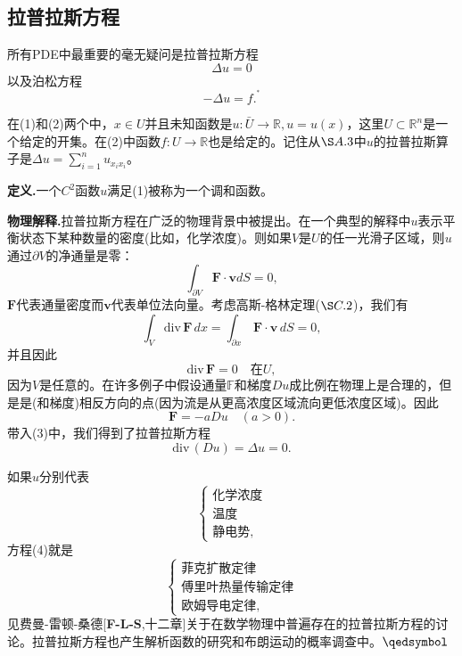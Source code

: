 \documentclass[leqno]{article}
\numberwithin{equation}{subsection}%
\begin{document}
\subsection{拉普拉斯方程}
所有PDE中最重要的毫无疑问是拉普拉斯方程
\begin{equation}
\Delta u=0
\end{equation}
以及泊松方程
\begin{equation}
-\Delta u=f.^{{}^{*}}
\end{equation}
\par
在(1)和(2)两个中，$x\in U$并且未知函数是$u:\bar{U}\rightarrow\mathbb{R},u=u(x)$，这里$U\subset\mathbb{R}^{n}$是一个给定的开集。在(2)中函数$f:U\rightarrow\mathbb{R}$也是给定的。记住从$\S A.3$中$u$的拉普拉斯算子是$\Delta u=\sum_{i=1}^{n}u_{x_{i}x_{i}}$。
\par
\noindent\textbf{定义.}一个$C^{2}$函数$u$满足(1)被称为一个调和函数。
\par
\noindent\textbf{物理解释.}拉普拉斯方程在广泛的物理背景中被提出。在一个典型的解释中$u$表示平衡状态下某种数量的密度(比如，化学浓度)。则如果$V$是$U$的任一光滑子区域，则$u$通过$\partial V$的净通量是零：
\begin{equation*}
\int_{\partial V}\mathbf{F}\cdot\mathbf{v}dS=0,
\end{equation*}
$\mathbf{F}$代表通量密度而$\mathbf{v}$代表单位法向量。考虑高斯-格林定理($\S C.2$)，我们有
\begin{equation*}
\int_{V}\text{div}\,\mathbf{F}\,dx=\int_{\partial x}\,\mathbf{F}\cdot\mathbf{v}\,dS=0,
\end{equation*}
并且因此
\begin{equation}
\text{div}\,\mathbf{F}=0\quad\text{在}U,
\end{equation}
因为$V$是任意的。在许多例子中假设通量$\mathbb{F}$和梯度$Du$成比例在物理上是合理的，但是是(和梯度)相反方向的点(因为流是从更高浓度区域流向更低浓度区域)。因此
\begin{equation}
\mathbf{F}=-aDu\quad(a>0).
\end{equation}
带入(3)中，我们得到了拉普拉斯方程
\begin{equation*}
\text{div}\,(Du)=\Delta u=0.
\end{equation*}
\par
如果$u$分别代表
\begin{equation*}
\begin{cases}
\text{化学浓度}\\
\text{温度}\\
\text{静电势},
\end{cases}
\end{equation*}
方程(4)就是
\begin{equation*}
\begin{cases}
\text{菲克扩散定律}\\
\text{傅里叶热量传输定律}\\
\text{欧姆导电定律},
\end{cases}
\end{equation*}
见费曼-雷顿-桑德[\textbf{F-L-S},十二章]关于在数学物理中普遍存在的拉普拉斯方程的讨论。拉普拉斯方程也产生解析函数的研究和布朗运动的概率调查中。$\hfill\qedsymbol$
\end{document}
